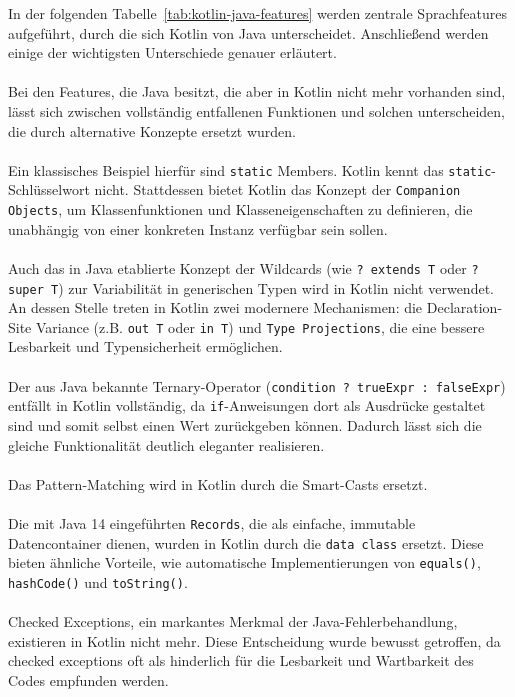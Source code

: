 \documentclass[11pt]{article}
\begin{document}
    In der folgenden Tabelle~\ref{tab:kotlin-java-features} werden zentrale Sprachfeatures aufgeführt, durch die sich Kotlin von Java unterscheidet.
    Anschließend werden einige der wichtigsten Unterschiede genauer erläutert.\\
    \\
    Bei den Features, die Java besitzt, die aber in Kotlin nicht mehr vorhanden sind, lässt sich zwischen vollständig entfallenen Funktionen und solchen unterscheiden, die durch alternative Konzepte ersetzt wurden.\\
    \\
    Ein klassisches Beispiel hierfür sind \texttt{static} Members.
    Kotlin kennt das \texttt{static}-Schlüsselwort nicht.
    Stattdessen bietet Kotlin das Konzept der \texttt{Companion Objects}, um Klassenfunktionen und Klasseneigenschaften zu definieren, die unabhängig von einer konkreten Instanz verfügbar sein sollen.\\
    \\
    Auch das in Java etablierte Konzept der Wildcards (wie \texttt{? extends T} oder \texttt{? super T}) zur Variabilität in generischen Typen wird in Kotlin nicht verwendet.
    An dessen Stelle treten in Kotlin zwei modernere Mechanismen: die Declaration-Site Variance (z.B. \texttt{out T} oder \texttt{in T}) und \texttt{Type Projections}, die eine bessere Lesbarkeit und Typensicherheit ermöglichen.\\
    \\
    Der aus Java bekannte Ternary-Operator (\texttt{condition ? trueExpr : falseExpr}) entfällt in Kotlin vollständig, da \texttt{if}-Anweisungen dort als Ausdrücke gestaltet sind und somit selbst einen Wert zurückgeben können.
    Dadurch lässt sich die gleiche Funktionalität deutlich eleganter realisieren.\\
    \\
    Das Pattern-Matching wird in Kotlin durch die Smart-Casts ersetzt.\\
    \\
    Die mit Java 14 eingeführten \texttt{Records}, die als einfache, immutable Datencontainer dienen, wurden in Kotlin durch die \texttt{data class} ersetzt.
    Diese bieten ähnliche Vorteile, wie automatische Implementierungen von \texttt{equals()}, \texttt{hashCode()} und \texttt{toString()}.\\
    \\
    Checked Exceptions, ein markantes Merkmal der Java-Fehlerbehandlung, existieren in Kotlin nicht mehr.
    Diese Entscheidung wurde bewusst getroffen, da checked exceptions oft als hinderlich für die Lesbarkeit und Wartbarkeit des Codes empfunden werden.
\end{document}
